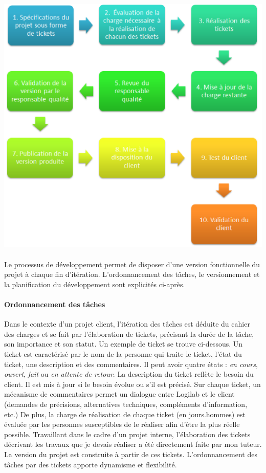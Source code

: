 \documentclass {report}
\begin{document}
\begin{center}
\includegraphics[scale=0.5]{iteration.png}
\end{center}

\paragraph{}
Le processus de développement permet de disposer d’une version fonctionnelle du projet à chaque fin d’itération. L'ordonnancement des tâches, le versionnement et la planification du développement sont explicités ci-après.



\paragraph{Ordonnancement des tâches}
Dans le contexte d'un projet client, l'itération des tâches est déduite du cahier des charges et se fait par l'élaboration de tickets, précisant la durée de la tâche, son importance et son statut. Un exemple de ticket se trouve ci-dessous. Un ticket est caractérisé par le nom de la personne qui traite le ticket, l'état du ticket, une description et des commentaires. Il peut avoir quatre états : \textit{en cours}, \textit{ouvert}, \textit{fait} ou \textit{en attente de retour}. La description du ticket reflète le besoin du client. Il est mis à jour si le besoin évolue ou s'il est précisé. Sur chaque ticket, un mécanisme de commentaires permet un dialogue entre Logilab et le client (demandes de précisions, alternatives techniques, compléments d’information, etc.) De plus, la charge de réalisation de chaque ticket (en jours.hommes) est évaluée par les personnes susceptibles de le réaliser afin d'être la plus réelle possible. Travaillant dans le cadre d'un projet interne, l'élaboration des tickets décrivant les travaux que je devais réaliser a été directement faite par mon tuteur. La version du projet est construite à partir de ces tickets. L'ordonnancement des tâches par des tickets apporte dynamisme et flexibilité.
\end{document}
